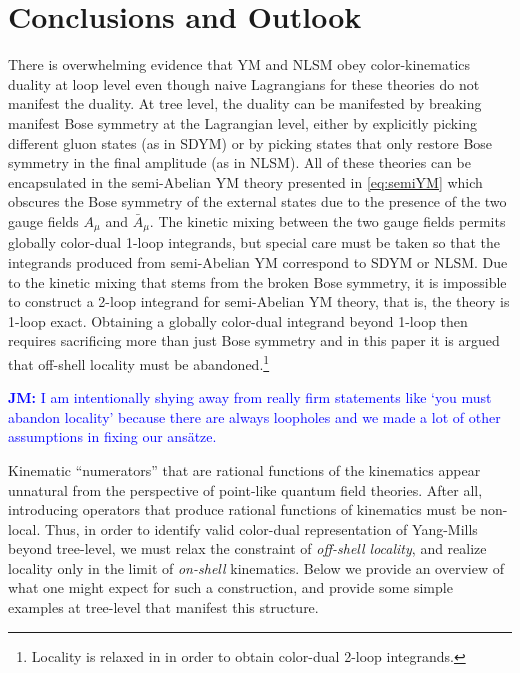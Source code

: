 \documentclass[11pt,letter]{article}
\newcommand{\jm}[1]{\textcolor{blue}{\textbf{JM: }{#1}}}
\newcommand{\ansatze}{ans\"atze} %
\begin{document}
\section{Conclusions and Outlook}\label{conclusions}
There is overwhelming evidence that YM and NLSM obey color-kinematics duality at loop level even though naive Lagrangians for these theories do not manifest the duality.
At tree level, the duality can be manifested by breaking manifest Bose symmetry at the Lagrangian level, either by explicitly picking different gluon states (as in SDYM) or by picking states that only restore Bose symmetry in the final amplitude (as in NLSM).
All of these theories can be encapsulated in the semi-Abelian YM theory presented in \cref{eq:semiYM} which obscures the Bose symmetry of the external states due to the presence of the two gauge fields $A_\mu$ and $\bar{A}_\mu$.
The kinetic mixing between the two gauge fields permits globally color-dual 1-loop integrands, but special care must be taken so that the integrands produced from semi-Abelian YM correspond to SDYM or NLSM.
Due to the kinetic mixing that stems from the broken Bose symmetry, it is impossible to construct a 2-loop integrand for semi-Abelian YM theory, that is, the theory is 1-loop exact.
Obtaining a globally color-dual integrand beyond 1-loop then requires sacrificing more than just Bose symmetry and in this paper it is argued that off-shell locality must be abandoned.\footnote{Locality is relaxed in \cite{Mogull:2015adi} in order to obtain color-dual 2-loop integrands.}

\jm{I am intentionally shying away from really firm statements like `you must abandon locality' because there are always loopholes and we made a lot of other assumptions in fixing our \ansatze{}.}

Kinematic ``numerators'' that are rational functions of the kinematics appear unnatural from the perspective of point-like quantum field theories. After all, introducing operators that produce rational functions of kinematics must be non-local. Thus, in order to identify valid color-dual representation of Yang-Mills beyond tree-level, we must relax the constraint of \textit{off-shell locality}, and realize locality only in the limit of \textit{on-shell} kinematics. Below we provide an overview of what one might expect for such a construction, and provide some simple examples at tree-level that manifest this structure. 
\end{document}
